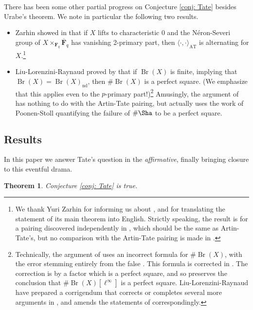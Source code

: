 \documentclass[10pt, reqno]{amsart}
\numberwithin{equation}{subsection}
\newcommand{\F}{\mathbf{F}}
\newcommand{\ol}[1]{\overline{#1}}
\newcommand{\mrm}[1]{\mathrm{#1}}
\DeclareMathOperator{\Br}{Br}
\DeclareMathOperator{\nd}{nd}
\newtheorem{thm}{Theorem}[section]
\theoremstyle{remark}
\begin{document}

There has been some other partial progress on Conjecture \ref{conj: Tate} besides Urabe's theorem. We note in particular the following two results. 
 \begin{itemize}
 \item Zarhin showed in \cite{Zar} that if $X$ lifts to characteristic $0$ and the N\'{e}ron-Severi group of $X \times_{\F_q} \ol{\F}_q$ has vanishing 2-primary part, then $\langle  \cdot, \cdot \rangle_{\mrm{AT}}$ is alternating for $X$.\footnote{We thank Yuri Zarhin for informing us about \cite{Zar}, and for translating the statement of its main theorem into English. Strictly speaking, the result is for a pairing discovered independently in \cite{Zar}, which should be the same as Artin-Tate's, but no comparison with the Artin-Tate pairing is made in \cite{Zar}.}
 \item Liu-Lorenzini-Raynaud \cite{LLR05} proved by that if $\Br(X)$ is finite, implying that $\Br(X) = \Br(X)_{\nd}$, then $\# \Br(X)$ is a perfect square. (We emphasize that this applies even to the $p$-primary part!)\footnote{Technically, the argument of \cite{LLR05} uses an incorrect formula for $\# \Br(X)$, with the error stemming entirely from the false \cite[Lemma 4.2]{Go79}. This formula is corrected in \cite{Geiss}. The correction is by a factor which is a perfect square, and so preserves the conclusion that $\# \Br(X)[\ell^{\infty}]$ is a perfect square. Liu-Lorenzini-Raynaud have prepared a corrigendum \cite{LLRCorr} that corrects or completes several more arguments in \cite{Go79}, and amends the statements of \cite{LLR05} correspondingly.} Amusingly, the argument of \cite{LLR05} has nothing to do with the Artin-Tate pairing, but actually uses the work of Poonen-Stoll quantifying the failure of $\# \Sha$ to be a perfect square. 
 
 \end{itemize}
 	
\subsection{Results} In this paper we answer Tate's question in the \emph{affirmative}, finally bringing closure to this eventful drama.

\begin{thm}\label{thm: proof of conj} Conjecture \ref{conj: Tate} is true. 
\end{thm}
\end{document}
